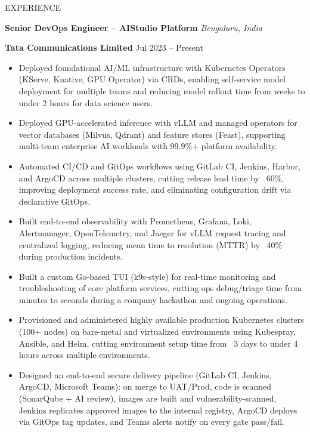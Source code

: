 \documentclass{resume}
\begin{document}
\begin{rSection}{EXPERIENCE}

\textbf{\textcolor{myblue}{Senior DevOps Engineer -- AIStudio Platform}}
\hfill \textit{Bengaluru, India}

\textbf{\textcolor{companyblue}{Tata Communications Limited}}
\hfill \textcolor{companyblue}{Jul 2023 -- Present}

\begin{itemize}
\itemsep -3pt
\parsep 0pt
\partopsep 0pt
\topsep 2pt

\item Deployed foundational AI/ML infrastructure with Kubernetes Operators (KServe, Knative, GPU Operator) via CRDs, enabling self-service model deployment for multiple teams and reducing model rollout time from weeks to under 2 hours for data science users.

\item Deployed GPU-accelerated inference with vLLM and managed operators for vector databases (Milvus, Qdrant) and feature stores (Feast), supporting multi-team enterprise AI workloads with 99.9\%+ platform availability.

\item Automated CI/CD and GitOps workflows using GitLab CI, Jenkins, Harbor, and ArgoCD across multiple clusters, cutting release lead time by ~60\%, improving deployment success rate, and eliminating configuration drift via declarative GitOps.

\item Built end-to-end observability with Prometheus, Grafana, Loki, Alertmanager, OpenTelemetry, and Jaeger for vLLM request tracing and centralized logging, reducing mean time to resolution (MTTR) by ~40\% during production incidents.

\item Built a custom Go-based TUI (k9s-style) for real-time monitoring and troubleshooting of core platform services, cutting ops debug/triage time from minutes to seconds during a company hackathon and ongoing operations.

\item Provisioned and administered highly available production Kubernetes clusters (100+ nodes) on bare-metal and virtualized environments using Kubespray, Ansible, and Helm, cutting environment setup time from ~3 days to under 4 hours across multiple environments.

\item Designed an end-to-end secure delivery pipeline (GitLab CI, Jenkins, ArgoCD, Microsoft Teams): on merge to UAT/Prod, code is scanned (SonarQube + AI review), images are built and vulnerability-scanned, Jenkins replicates approved images to the internal registry, ArgoCD deploys via GitOps tag updates, and Teams alerts notify on every gate pass/fail.

\end{itemize}

\end{rSection}
\end{document}
